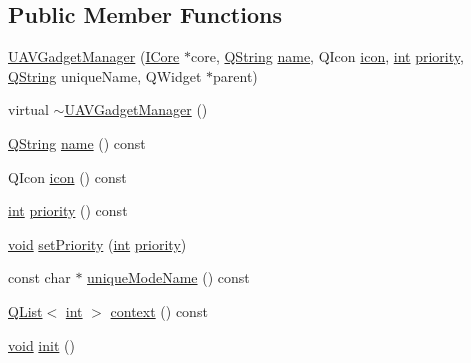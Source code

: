 \subsection*{Public Member Functions}
\begin{DoxyCompactItemize}
\item 
\hyperlink{group___core_plugin_gaafe1ad3bbbc0f406d14529f20d61b981}{U\-A\-V\-Gadget\-Manager} (\hyperlink{class_core_1_1_i_core}{I\-Core} $\ast$core, \hyperlink{group___u_a_v_objects_plugin_gab9d252f49c333c94a72f97ce3105a32d}{Q\-String} \hyperlink{glext_8h_ad977737dfc9a274a62741b9500c49a32}{name}, Q\-Icon \hyperlink{group___core_plugin_gaa78801714eacd4be88c94f7ae90aae7a}{icon}, \hyperlink{ioapi_8h_a787fa3cf048117ba7123753c1e74fcd6}{int} \hyperlink{group___core_plugin_ga912a165a46888c9dafb5ba50b05e62e2}{priority}, \hyperlink{group___u_a_v_objects_plugin_gab9d252f49c333c94a72f97ce3105a32d}{Q\-String} unique\-Name, Q\-Widget $\ast$parent)
\item 
virtual \hyperlink{group___core_plugin_ga1b25440353864a36dd0f1d9a62e434ac}{$\sim$\-U\-A\-V\-Gadget\-Manager} ()
\item 
\hyperlink{group___u_a_v_objects_plugin_gab9d252f49c333c94a72f97ce3105a32d}{Q\-String} \hyperlink{group___core_plugin_ga1e4c1ea0c0876c989d6c62545d239837}{name} () const 
\item 
Q\-Icon \hyperlink{group___core_plugin_gaa78801714eacd4be88c94f7ae90aae7a}{icon} () const 
\item 
\hyperlink{ioapi_8h_a787fa3cf048117ba7123753c1e74fcd6}{int} \hyperlink{group___core_plugin_ga912a165a46888c9dafb5ba50b05e62e2}{priority} () const 
\item 
\hyperlink{group___u_a_v_objects_plugin_ga444cf2ff3f0ecbe028adce838d373f5c}{void} \hyperlink{group___core_plugin_gac0180544ce53efc69e7e9f4d45269463}{set\-Priority} (\hyperlink{ioapi_8h_a787fa3cf048117ba7123753c1e74fcd6}{int} \hyperlink{group___core_plugin_ga912a165a46888c9dafb5ba50b05e62e2}{priority})
\item 
const char $\ast$ \hyperlink{group___core_plugin_gafb097fcb2b5b3aca65315305bc09872d}{unique\-Mode\-Name} () const 
\item 
\hyperlink{class_q_list}{Q\-List}$<$ \hyperlink{ioapi_8h_a787fa3cf048117ba7123753c1e74fcd6}{int} $>$ \hyperlink{group___core_plugin_gaeef334ae2d88e0490cea760db1c90684}{context} () const 
\item 
\hyperlink{group___u_a_v_objects_plugin_ga444cf2ff3f0ecbe028adce838d373f5c}{void} \hyperlink{group___core_plugin_ga478da8486a7df4755e4623c70251e17c}{init} ()

\end{DoxyCompactItemize}

